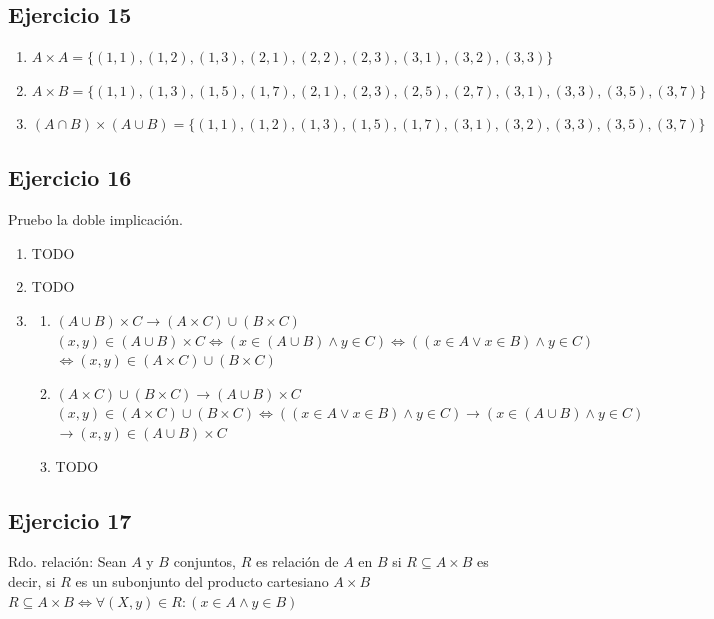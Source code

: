 \subsection{Ejercicio 15}
\begin{enumerate}
    \item $A \times A = \{(1,1),(1,2),(1,3),(2,1),(2,2),(2,3),(3,1),(3,2),(3,3)\}$
    \item $A \times B = \{(1,1),(1,3),(1,5),(1,7),(2,1),(2,3),(2,5),(2,7),(3,1),(3,3),(3,5),(3,7)\}$
    \item $(A\cap B) \times (A\cup B) = \{(1,1),(1,2),(1,3),(1,5),(1,7),(3,1),(3,2),(3,3),(3,5),(3,7)\}$
\end{enumerate}

\subsection{Ejercicio 16}
Pruebo la doble implicación. 
\begin{enumerate}[label=(\alph*)]
    \item TODO
    \item TODO
    \item \begin{enumerate}
        \item $(A \cup B) \times C \rightarrow (A \times C) \cup (B \times C)$\\
                $(x, y) \in (A\cup B) \times C \iff (x \in (A\cup B) \wedge y \in C) \iff ((x \in A \vee x \in B) \wedge y \in C)$\\
                $\iff (x,y) \in (A\times C) \cup (B \times C)$
        \item $(A \times C) \cup (B \times C) \rightarrow (A \cup B) \times C$\\
                $(x,y) \in (A \times C) \cup (B \times C) \iff ((x \in A \vee x \in B) \wedge y\in C) \rightarrow (x\in (A \cup B) \wedge y \in C)$\\
                $\rightarrow (x, y) \in (A \cup B) \times C$ 
    \item TODO
    \end{enumerate}
\end{enumerate}

\subsection{Ejercicio 17}
Rdo. relación: Sean $A$ y $B$ conjuntos, $R$ es relación de $A$ en $B$ si $R \subseteq A\times B$ es decir, si $R$ es un subonjunto del producto cartesiano $A \times B$\\
$R \subseteq A \times B \iff \forall (X,y) \in R : (x \in A \wedge y \in B)$

